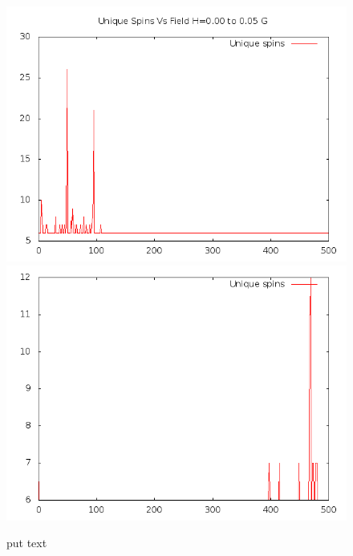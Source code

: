 \documentclass{article}
\begin{document}
\begin{figure}[ht]
\centering
\includegraphics[scale=0.5]{110/000to005Freq.png}
\includegraphics[scale=0.5]{110/005to000Freq.png}
\caption{put text}
\end{figure}
\clearpage
\end{document}
